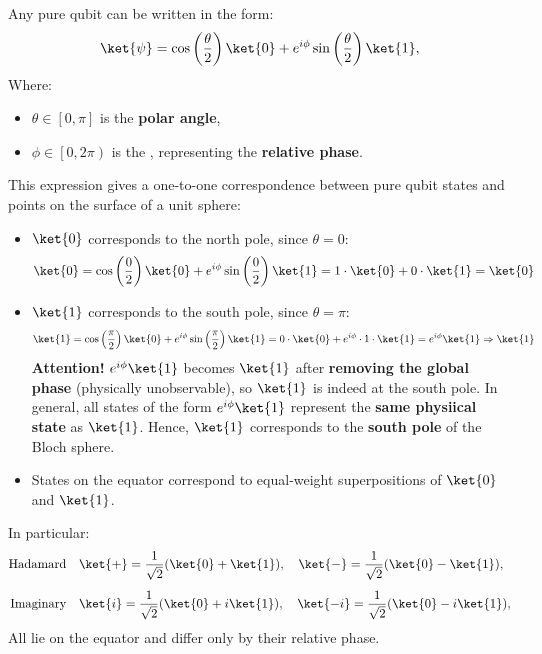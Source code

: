 \highspace
Any pure qubit can be written in the form:
\begin{equation*}
    \ket{\psi}
    =
    \cos\left(\frac{\theta}{2}\right)\ket{0}
    +
    e^{i\phi}\sin\left(\frac{\theta}{2}\right)\ket{1},
\end{equation*}
Where:
\begin{itemize}
    \item $\theta \in \left[0,\pi\right]$ is the \textbf{polar angle},
    \item $\phi \in \left[0,2\pi\right)$ is the , representing the \textbf{relative phase}.
\end{itemize}
This expression gives a one-to-one correspondence between pure qubit states and points on the surface of a unit sphere:
\begin{itemize}
    \item $\ket{0}$ corresponds to the north pole, since $\theta = 0$:
    \begin{equation*}
        \ket{0} = \cos\left(\dfrac{0}{2}\right)\ket{0} + e^{i\phi}\sin\left(\dfrac{0}{2}\right)\ket{1} = 1 \cdot \ket{0} + 0 \cdot \ket{1} = \ket{0}
    \end{equation*}
    \item $\ket{1}$ corresponds to the south pole, since $\theta = \pi$:
    \begin{equation*}
        \ket{1} = \cos\left(\dfrac{\pi}{2}\right)\ket{0} + e^{i\phi}\sin\left(\dfrac{\pi}{2}\right)\ket{1} = 0 \cdot \ket{0} + e^{i\phi} \cdot 1 \cdot \ket{1} = e^{i\phi} \ket{1} \Rightarrow \ket{1}
    \end{equation*}
    \textcolor{Red2}{ \textbf{Attention!}} $e^{i\phi}\ket{1}$ becomes $\ket{1}$ after \textbf{removing the global phase} (physically unobservable), so $\ket{1}$ is indeed at the south pole. In general, all states of the form $e^{i\phi}\ket{1}$ represent the \textbf{same physiical state} as $\ket{1}$. Hence, $\ket{1}$ corresponds to the \textbf{south pole} of the Bloch sphere.
    \item States on the equator correspond to equal-weight superpositions of $\ket{0}$ and $\ket{1}$.
\end{itemize}
In particular:
\begin{align*}
    \text{Hadamard} & \quad \ket{+}  = \frac{1}{\sqrt{2}}(\ket{0}+\ket{1}), \quad \ket{-} = \frac{1}{\sqrt{2}}(\ket{0}-\ket{1}),\\[.5em]
    \text{Imaginary} & \quad \ket{i} = \frac{1}{\sqrt{2}}(\ket{0}+i\ket{1}), \quad \ket{-i} = \frac{1}{\sqrt{2}}(\ket{0}-i\ket{1}),
\end{align*}
All lie on the equator and differ only by their relative phase.

